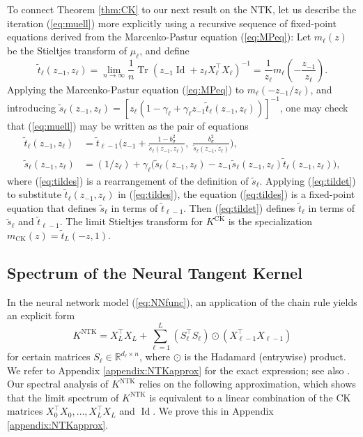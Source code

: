 \documentclass{article}
\theoremstyle{definition}
\newcommand{\R}{\mathbb{R}}
\newcommand{\Id}{\operatorname{Id}}
\newcommand{\CK}{\text{CK}}
\newcommand{\NTK}{\text{NTK}}
\newcommand{\Tr}{\operatorname{Tr}}
\newcommand{\1}{\mathbf{1}}
\begin{document}
To connect Theorem \ref{thm:CK} to our next result on the NTK, let us describe
the iteration (\ref{eq:muell})
more explicitly using a recursive sequence of fixed-point equations derived from
the Marcenko-Pastur equation (\ref{eq:MPeq}):
Let $m_\ell(z)$ be the Stieltjes transform of $\mu_\ell$, and define
\[\tilde{t}_\ell(z_{-1},z_\ell)=\lim_{n \to \infty} \frac{1}{n}
\Tr (z_{-1}\Id+z_\ell X_\ell^\top X_\ell)^{-1}
=\frac{1}{z_\ell}m_\ell\left(-\frac{z_{-1}}{z_\ell}\right).\]
Applying the Marcenko-Pastur equation (\ref{eq:MPeq}) to
$m_\ell(-z_{-1}/z_\ell)$, and introducing
$\tilde{s}_\ell(z_{-1},z_\ell)=[z_\ell(1-\gamma_\ell+\gamma_\ell z_{-1}
\tilde{t}_\ell(z_{-1},z_\ell))]^{-1}$, one may check that (\ref{eq:muell})
may be written as the pair of equations
\begin{align}
\tilde{t}_\ell(z_{-1},z_\ell)&=\tilde{t}_{\ell-1}\bigg(
z_{-1}+\frac{1-b_\sigma^2}{\tilde{s}_\ell(z_{-1},z_\ell)},\;
\frac{b_\sigma^2}{\tilde{s}_\ell(z_{-1},z_\ell)}\bigg),\label{eq:tildet}\\
\tilde{s}_\ell(z_{-1},z_\ell)
&=(1/z_\ell)+\gamma_\ell\Big(\tilde{s}_\ell(z_{-1},z_\ell)-z_{-1}
\tilde{s}_\ell(z_{-1},z_\ell)\tilde{t}_\ell(z_{-1},z_\ell)\Big),\label{eq:tildes}
\end{align}
where (\ref{eq:tildes}) is a rearrangement of the definition of
$\tilde{s}_\ell$. Applying (\ref{eq:tildet}) to substitute
$\tilde{t}_\ell(z_{-1},z_\ell)$ in (\ref{eq:tildes}), the equation (\ref{eq:tildes}) is a fixed-point equation that defines
$\tilde{s}_\ell$ in terms of $\tilde{t}_{\ell-1}$. Then (\ref{eq:tildet})
defines $\tilde{t}_\ell$ in terms of
$\tilde{s}_\ell$ and $\tilde{t}_{\ell-1}$. The limit Stieltjes transform for
$K^\CK$ is the specialization $m_\CK(z)=\tilde{t}_L(-z,1)$.

\subsection{Spectrum of the Neural Tangent Kernel}\label{sec:NTK}

In the neural network model (\ref{eq:NNfunc}), an
application of the chain rule yields an explicit form
\[K^\NTK=X_L^\top X_L+\sum_{\ell=1}^L (S_\ell^\top S_\ell) \odot
(X_{\ell-1}^\top X_{\ell-1})\]
for certain matrices $S_\ell \in \R^{d_\ell \times n}$,
where $\odot$ is the Hadamard (entrywise) product. We refer to Appendix
\ref{appendix:NTKapprox}
for the exact expression; see also \cite[Eq.\ (1.7)]{huang2019dynamics}.
Our spectral analysis of $K^\NTK$ relies on the following approximation,
which shows that the limit spectrum of $K^\NTK$ is equivalent to a linear
combination of the CK matrices $X_0^\top X_0,\ldots,X_L^\top X_L$
and $\Id$. We prove this in Appendix \ref{appendix:NTKapprox}.
\end{document}
